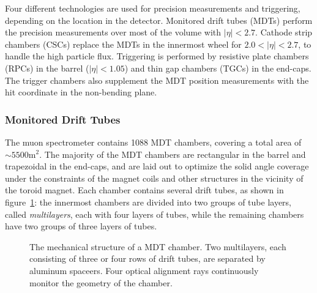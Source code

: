 Four different technologies are used for precision measurements and triggering, depending on the location in the detector. Monitored drift tubes (MDTs) perform the precision measurements over most of the volume with $|\eta|<2.7$. Cathode strip chambers (CSCs) replace the MDTs in the innermost wheel for $2.0<|\eta|<2.7$, to handle the high particle flux. Triggering is performed by resistive plate chambers (RPCs) in the barrel ($|\eta|<1.05$) and thin gap chambers (TGCs) in the end-caps. The trigger chambers also supplement the MDT position measurements with the hit coordinate in the non-bending plane. 

\subsubsection{Monitored Drift Tubes}
The muon spectrometer contains 1088 MDT chambers, covering a total area of $\sim 5500 \mbox{m}^2$. The majority of the MDT chambers are rectangular in the barrel and trapezoidal in the end-caps, and are laid out to optimize the solid angle coverage under the constraints of the magnet coils and other structures in the vicinity of the toroid magnet. Each chamber contains several drift tubes, as shown in figure~\ref{fig:ATLAS-MS-MDT-chamber}: the innermost chambers are divided into two groups of tube layers, called \emph{multilayers}, each with four layers of tubes, while the remaining chambers have two groups of three layers of tubes. 

\begin{figure}[htbp]
	\centering
	\caption{The mechanical structure of a MDT chamber. Two multilayers, each consisting of three or four rows of drift tubes, are separated by aluminum spaceers. Four optical alignment rays continuously monitor the geometry of the chamber.}
	\label{fig:ATLAS-MS-MDT-chamber}
\end{figure}


